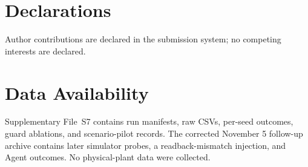 \documentclass[journal]{IEEEtran}
\begin{document}
\section*{Declarations}
Author contributions are declared in the submission system; no competing
interests are declared.

\section*{Data Availability}
Supplementary File~S7 contains run manifests, raw CSVs, per-seed outcomes, guard ablations, and scenario-pilot records. The corrected November 5 follow-up archive contains later simulator probes, a readback-mismatch injection, and Agent outcomes. No physical-plant data were collected.



\end{document}
